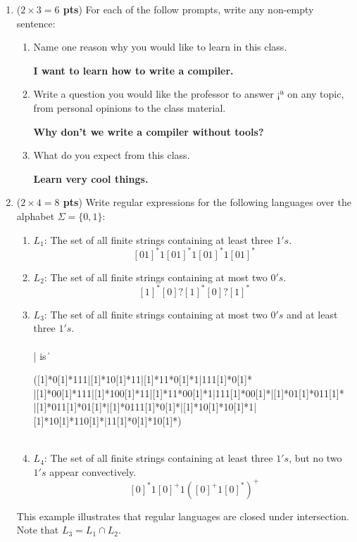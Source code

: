 \documentclass[10pt]{article}
\newcommand {\pts}[1]{({\bf #1 pts})}
\begin{document}
\begin{enumerate}
  \item \pts{$2\times 3=6$} For each of the follow prompts, write any non-empty sentence:
  \begin{enumerate}
           \item Name one reason why you would like to learn in this class.
            

              \textbf{I want to learn how to write a compiler.}
            

           \item Write a question you would like the professor to answer ¡ª on any topic, from personal opinions to the class material.
            

              \textbf{Why don't we write a compiler without tools?}
            

           \item What do you expect from this class.
            

             \textbf{ Learn very cool things.}
            

  \end{enumerate}
  \item \pts{$2\times 4=8$} Write regular expressions for the following languages over the alphabet $\Sigma=\{0,1\}$:
 \begin{enumerate}
           \item $L_1$: The set of all finite strings containing at least three $1's$.
            \[
             [01]^{*}1[01]^{*}1[01]^{*}1[01]^{*}
            \]
           \item $L_2$: The set of all finite strings containing at most two $0's$.
            \[
             [1]^{*}[0]?[1]^{*}[0]?[1]^{*}
            \]
           \item $L_3$: The set of all finite strings containing at most two $0's$ and at least three $1's$.
            \\
            \\
           { | is \|}
            
            ([1]*0[1]*111|[1]*10[1]*11|[1]*11*0[1]*1|111[1]*0[1]*\\|[1]*00[1]*111|[1]*100[1]*11|[1]*11*00[1]*1|111[1]*00[1]*|[1]*01[1]*011[1]*\\|[1]*011[1]*01[1]*|[1]*0111[1]*0[1]*|[1]*10[1]*10[1]*1|[1]*10[1]*110[1]*|11[1]*0[1]*10[1]*)
            \\
            \\
           \item $L_4$: The set of all finite strings containing at least three $1's$, but no two $1's$ appear convectively.
            \[
            [0]^{*}1[0]^{+}1([0]^{+}1[0]^{*})^{+}
            \]
   \end{enumerate}
   This example illustrates that regular languages are closed under intersection. Note that
   $L_3=L_1\cap L_2$.


\end{enumerate}
\end{document}
